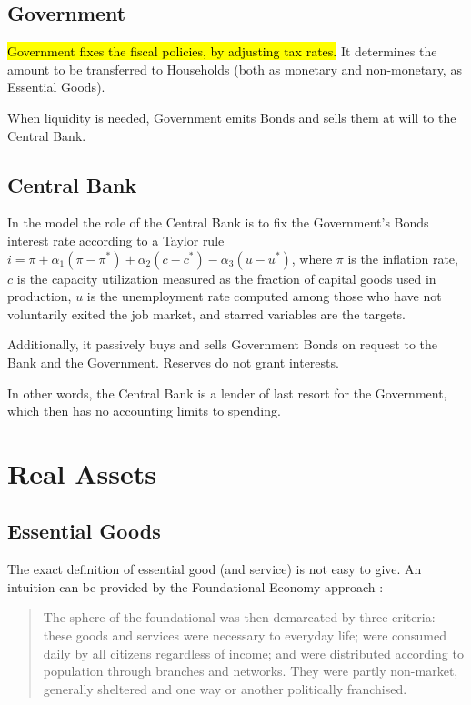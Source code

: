 \documentclass[a4paper, headings=standardclasses]{scrartcl}
\begin{document}
\subsection{Government}
\hl{Government fixes the fiscal policies, by adjusting tax rates.} It determines the amount to be transferred to Households (both as monetary and non-monetary, as Essential Goods).

When liquidity is needed, Government emits Bonds and sells them at will to the Central Bank.

\subsection{Central Bank}
In the model the role of the Central Bank is to fix the Government's Bonds interest rate according to a Taylor rule $i = \pi + \alpha_1 (\pi - \pi^*) + \alpha_2 (c - c^*) - \alpha_3 (u - u^*)$, where $\pi$ is the inflation rate, $c$ is the capacity utilization measured as the fraction of capital goods used in production, $u$ is the unemployment rate computed among those who have not voluntarily exited the job market, and starred variables are the targets.

Additionally, it passively buys and sells Government Bonds on request to the Bank and the Government. Reserves do not grant interests.

In other words, the Central Bank is a lender of last resort for the Government, which then has no accounting limits to spending.

\section{Real Assets}
\subsection{Essential Goods}
The exact definition of essential good (and service) is not easy to give. An intuition can be provided by the Foundational Economy approach \parencite{arcidiacono2018}: \begin{quote}
	The sphere of the foundational was then demarcated by three criteria: these goods and services were necessary to everyday life; were consumed daily by all citizens regardless of income; and were distributed according to population through branches and networks. They were partly non-market, generally sheltered and one way or another politically franchised.
\end{quote}
\end{document}
